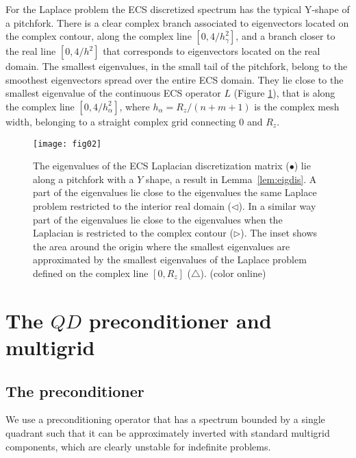 \documentclass[mathpazo]{cicp}
\theoremstyle{definition}
\numberwithin{equation}{section}
\providecommand{\wv}{}
\providecommand{\edt}{}
\begin{document}
For the Laplace problem the ECS discretized spectrum has the typical Y-shape of a pitchfork. There is a clear complex branch associated to eigenvectors located on the complex contour, along the complex line $[0,4/h_\gamma^2]$, and a branch closer to the real line $[0,4/h^2]$ that corresponds to eigenvectors located on the real domain. The smallest eigenvalues, in the small tail of the pitchfork, belong to the smoothest eigenvectors spread over the entire ECS domain. They lie close to the smallest \edt{eigenvalue} of the continuous ECS operator $L$ (Figure \ref{fig:dowsingrod}), that is along the complex line $[0,4/h_\alpha^2]$, where $h_\alpha = R_z/(n+m+1)$ is the complex mesh width, belonging to a straight complex grid connecting $0$ and $R_z$.
\begin{figure}[h!]
\begin{center}
\texttt{[image: fig02]}\caption{
\wv{ The eigenvalues of the ECS Laplacian discretization matrix ($\bullet$) lie along a pitchfork with a $Y$ shape, a result in Lemma~\ref{lem:eigdis}. 
 A part of the eigenvalues lie close to the eigenvalues the same Laplace problem restricted to the interior real domain ($\triangleleft$).  In a similar way part of the eigenvalues lie close to the eigenvalues when the Laplacian is restricted to the complex contour ($\triangleright$).} \wv{The inset shows the area around the origin where the smallest eigenvalues are approximated by the smallest eigenvalues of the Laplace problem defined on the complex line }$[0,R_z]$ ($\triangle$).
 (color online)}
\label{fig:dowsingrod}
\end{center}
\end{figure}

\section{The $QD$ preconditioner and multigrid} \label{sec:precmg}
\subsection{The preconditioner} \label{subsec:precon}
We use a preconditioning operator that has a spectrum bounded by a single quadrant such that it 
can be approximately inverted with standard multigrid components, which are clearly unstable for indefinite problems.
\end{document}
